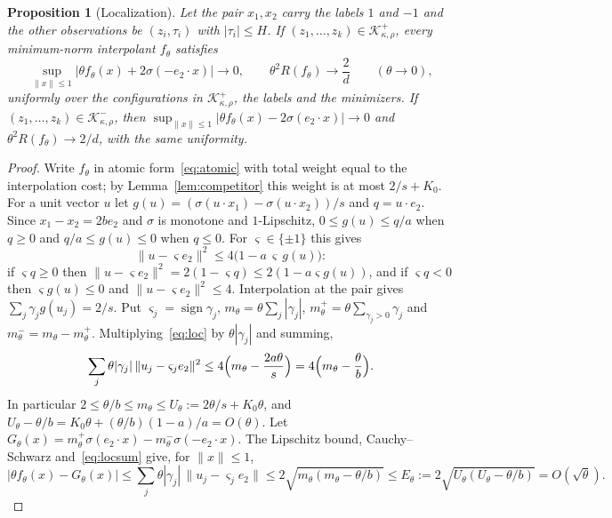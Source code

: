 \documentclass[11pt]{amsart}
\newtheorem{proposition}[theorem]{Proposition}
\theoremstyle{remark}
\numberwithin{equation}{section}
\begin{document}
\begin{proposition}[Localization]\label{prop:local}
Let the pair $x_1,x_2$ carry the labels $1$ and $-1$ and the other observations be $(z_i,\tau_i)$ with $|\tau_i|\le H$. If $(z_1,\dots,z_k)\in\mathcal K^+_{\kappa,\rho}$, every minimum-norm interpolant $f_\theta$ satisfies
\[
\sup_{\|x\|\le1}\bigl|\theta f_\theta(x)+2\sigma(-e_2\cdot x)\bigr|\to0,\qquad\theta^2R(f_\theta)\to\frac2d\qquad(\theta\to0),
\]
uniformly over the configurations in $\mathcal K^+_{\kappa,\rho}$, the labels and the minimizers. If $(z_1,\dots,z_k)\in\mathcal K^-_{\kappa,\rho}$, then $\sup_{\|x\|\le1}|\theta f_\theta(x)-2\sigma(e_2\cdot x)|\to0$ and $\theta^2R(f_\theta)\to2/d$, with the same uniformity.
\end{proposition}
\begin{proof}
Write $f_\theta$ in atomic form~\eqref{eq:atomic} with total weight equal to the interpolation cost; by Lemma~\ref{lem:competitor} this weight is at most $2/s+K_0$. For a unit vector $u$ let $g(u)=(\sigma(u\cdot x_1)-\sigma(u\cdot x_2))/s$ and $q=u\cdot e_2$. Since $x_1-x_2=2be_2$ and $\sigma$ is monotone and $1$-Lipschitz, $0\le g(u)\le q/a$ when $q\ge0$ and $q/a\le g(u)\le0$ when $q\le0$. For $\varsigma\in\{\pm1\}$ this gives
\begin{equation}\label{eq:loc}
\|u-\varsigma e_2\|^2\le4\bigl(1-a\,\varsigma\,g(u)\bigr):
\end{equation}
if $\varsigma q\ge0$ then $\|u-\varsigma e_2\|^2=2(1-\varsigma q)\le2(1-a\varsigma g(u))$, and if $\varsigma q<0$ then $\varsigma g(u)\le0$ and $\|u-\varsigma e_2\|^2\le4$. Interpolation at the pair gives $\sum_j\gamma_jg(u_j)=2/s$. Put $\varsigma_j=\operatorname{sign}\gamma_j$, $m_\theta=\theta\sum_j|\gamma_j|$, $m^+_\theta=\theta\sum_{\gamma_j>0}\gamma_j$ and $m^-_\theta=m_\theta-m^+_\theta$. Multiplying~\eqref{eq:loc} by $\theta|\gamma_j|$ and summing,
\begin{equation}\label{eq:locsum}
\sum_j\theta|\gamma_j|\,\|u_j-\varsigma_je_2\|^2\le4\Bigl(m_\theta-\frac{2a\theta}{s}\Bigr)=4\Bigl(m_\theta-\frac\theta b\Bigr).
\end{equation}
In particular $2\le\theta/b\le m_\theta\le U_\theta:=2\theta/s+K_0\theta$, and $U_\theta-\theta/b=K_0\theta+(\theta/b)(1-a)/a=O(\theta)$. Let $G_\theta(x)=m^+_\theta\sigma(e_2\cdot x)-m^-_\theta\sigma(-e_2\cdot x)$. The Lipschitz bound, Cauchy--Schwarz and~\eqref{eq:locsum} give, for $\|x\|\le1$,
\[
|\theta f_\theta(x)-G_\theta(x)|\le\sum_j\theta|\gamma_j|\,\|u_j-\varsigma_je_2\|\le2\sqrt{m_\theta(m_\theta-\theta/b)}\le E_\theta:=2\sqrt{U_\theta(U_\theta-\theta/b)}=O(\sqrt\theta).
\]
\end{proof}
\end{document}

